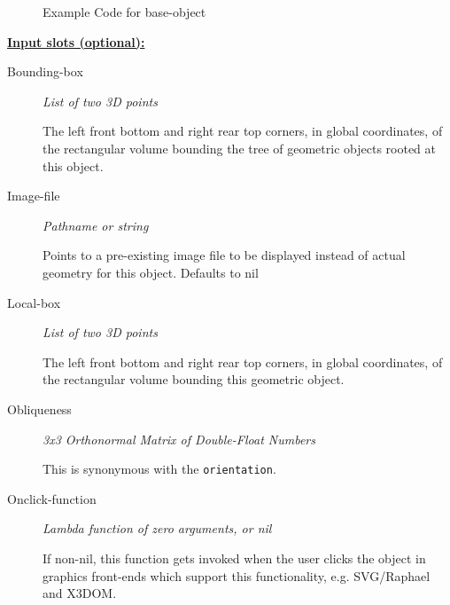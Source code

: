 \documentclass [11pt]{book}
\begin{document}
\begin{itemize}
\begin{figure}
\begin{lrbox}{\boxedverb}
\begin{minipage}{\linewidth}
{\begin{verbatim}
\end{verbatim}}
\end{minipage}
\end{lrbox}
\fbox{\usebox{\boxedverb}}

\caption{Example Code for base-object}

\label{fig:example-code-base-object}

\end{figure}





\textbf{
\underline{Input slots (optional):}}

\begin{description}

\item [Bounding-box]
\emph{List of two 3D points}

 The left front bottom and right rear top corners, in global coordinates,
of the rectangular volume bounding the tree of geometric objects rooted at this object.




\item [Image-file]
\emph{Pathname or string}

 Points to a pre-existing image file to be displayed instead of actual geometry for this object. Defaults to nil




\item [Local-box]
\emph{List of two 3D points}

 The left front bottom and right rear top corners, in global coordinates,
of the rectangular volume bounding this geometric object.




\item [Obliqueness]
\emph{3x3 Orthonormal Matrix of Double-Float Numbers}

 This is synonymous with the \texttt{orientation}.




\item [Onclick-function]
\emph{Lambda function of zero arguments, or nil}

 If non-nil, this
function gets invoked when the user clicks the object in graphics
front-ends which support this functionality, e.g. SVG/Raphael and X3DOM.





\end{description}
\end{itemize}
\end{document}
